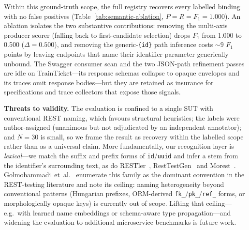 \documentclass[conference]{IEEEtran}
\begin{document}
Within this ground-truth scope, the full registry recovers every labelled binding with no false positives (Table~\ref{tab:semantic-ablation}, $P{=}R{=}F_1{=}1.000$). An ablation isolates the two substantive contributions: removing the multi-axis producer scorer (falling back to first-candidate selection) drops $F_1$ from 1.000 to 0.500 ($\Delta{=}0.500$), and removing the generic-\texttt{\{id\}} path inference costs $\sim{}9$ $F_1$ points by leaving endpoints that name their identifier parameter generically unbound. The Swagger consumer scan and the two JSON-path refinement passes are idle on TrainTicket---its response schemas collapse to opaque envelopes and its traces omit response bodies---but they are retained as insurance for specifications and trace collectors that expose those signals.

\textbf{Threats to validity.} The evaluation is confined to a single SUT with conventional REST naming, which favours structural heuristics; the labels were author-assigned (unanimous but not adjudicated by an independent annotator); and $N{=}30$ is small, so we frame the result as recovery within the labelled scope rather than as a universal claim. More fundamentally, our recognition layer is \emph{lexical}---we match the suffix and prefix forms of \texttt{id}/\texttt{uuid} and infer a stem from the identifier's surrounding text, as do RESTler~\cite{atlidakis2019restler}, RestTestGen~\cite{viglianisi2020resttestgen} and Morest~\cite{liu2022morest}. Golmohammadi~et~al.~\cite{golmohammadi2023survey} enumerate this family as the dominant convention in the REST-testing literature and note its ceiling: naming heterogeneity beyond conventional patterns (Hungarian prefixes, ORM-derived \texttt{fk\_}/\texttt{pk\_}/\texttt{ref\_} forms, or morphologically opaque keys) is currently out of scope. Lifting that ceiling---e.g.\ with learned name embeddings or schema-aware type propagation---and widening the evaluation to additional microservice benchmarks is future work.
\end{document}
